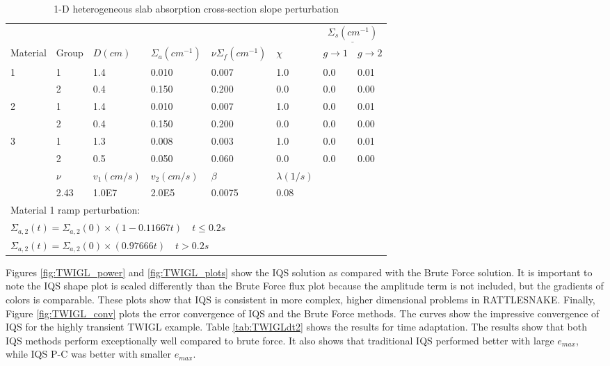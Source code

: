 \documentclass[12pt]{scrartcl}
\begin{document}
\begin{table}[!htbp]
\begin{center}
\caption{1-D heterogeneous slab absorption cross-section slope perturbation}
\label{tab:TWIGL_mat}
\begin{tabular}{llllllll}
\hline
  &  &  &  &  &  &  \multicolumn{2}{c}{$\underline{\Sigma_s (cm^{-1})} $} \\
Material & Group & $D (cm)$ & $\Sigma_a (cm^{-1})$ & $\nu\Sigma_f (cm^{-1})$ & $\chi$ & $g \rightarrow 1$ & $g \rightarrow 2$ \\
\hline
1 & 1 & 1.4 & 0.010 & 0.007 & 1.0 & 0.0 & 0.01 \\
  & 2 & 0.4 & 0.150 & 0.200 & 0.0 & 0.0 & 0.00  \\
2 & 1 & 1.4 & 0.010 & 0.007 & 1.0 & 0.0 & 0.01  \\
  & 2 & 0.4 & 0.150 & 0.200 & 0.0 & 0.0 & 0.00  \\
3 & 1 & 1.3 & 0.008 & 0.003 & 1.0 & 0.0 & 0.01  \\
  & 2 & 0.5 & 0.050 & 0.060 & 0.0 & 0.0 & 0.00  \\
\hline
  & $\nu$ & $v_1 (cm/s)$ & $v_2 (cm/s)$ & $\beta$ & $\lambda (1/s)$ &   &   \\
\hline
  & 2.43 & 1.0E7 & 2.0E5 & 0.0075 & 0.08 &   &   \\
\hline
 \multicolumn{8}{l}{\footnotesize Material 1 ramp perturbation:} \\
\multicolumn{8}{l}{\footnotesize $\Sigma_{a,2}(t)=\Sigma_{a,2}(0) \times (1-0.11667t) \quad t \leq 0.2 s$} \\
\multicolumn{8}{l}{\footnotesize $\Sigma_{a,2}(t)=\Sigma_{a,2}(0) \times (0.97666t) \quad t > 0.2 s$} \normalsize
\end{tabular}
\end{center}
\end{table}

Figures \ref{fig:TWIGL_power} and \ref{fig:TWIGL_plots} show the IQS  solution as compared with the Brute Force solution.  It is important to note the IQS shape plot is scaled differently than the Brute Force flux plot because the amplitude term is not included, but the gradients of colors is comparable.  These plots show that IQS is consistent in more complex, higher dimensional problems in RATTLESNAKE.  Finally, Figure \ref{fig:TWIGL_conv} plots the error convergence of IQS and the Brute Force methods.  The curves show the impressive convergence of IQS for the highly transient TWIGL example.  Table \ref{tab:TWIGLdt2} shows the results for time adaptation.  The results show that both IQS methods perform exceptionally well compared to brute force.  It also shows that traditional IQS performed better with large $e_{max}$, while IQS P-C was better with smaller $e_{max}$.
\end{document}
